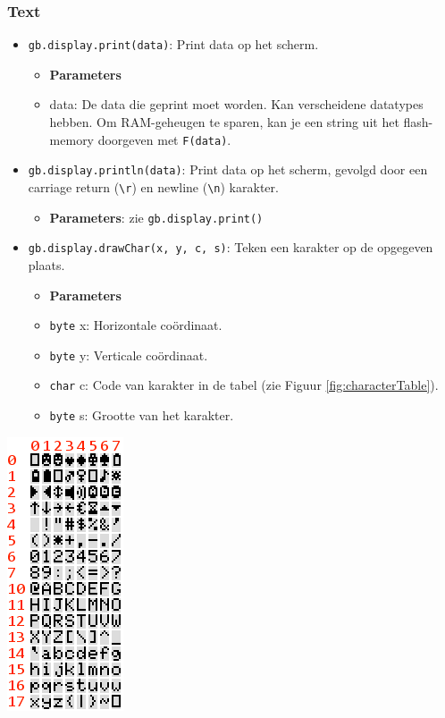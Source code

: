 \documentclass[a4paper,titlepage,12pt]{article}
\begin{document}
	\subsubsection{Text}
	\begin{minipage}{.75\textwidth}
		\begin{itemize}
			\item \texttt{gb.display.print(data)}: Print data op het scherm.
			\begin{itemize}
				\item [] \textbf{Parameters}
				\item data: De data die geprint moet worden. Kan verscheidene datatypes hebben. Om RAM-geheugen te sparen, kan je een string uit het flash-memory doorgeven met \texttt{F(data)}.
			\end{itemize}
		
			\item \texttt{gb.display.println(data)}: Print data op het scherm, gevolgd door een carriage return (\texttt{\textbackslash r}) en newline (\texttt{\textbackslash n}) karakter.
			\begin{itemize}
				\item [] \textbf{Parameters}: zie \texttt{gb.display.print()}
			\end{itemize}
		
			\item \texttt{gb.display.drawChar(x, y, c, s)}: Teken een karakter op de opgegeven plaats.
			\begin{itemize}
				\item [] \textbf{Parameters}
				\item \texttt{byte} x: Horizontale coördinaat.
				\item \texttt{byte} y: Verticale coördinaat.
				\item \texttt{char} c: Code van karakter in de tabel (zie Figuur \ref{fig:characterTable}).
				\item \texttt{byte} s: Grootte van het karakter.
			\end{itemize}
		\end{itemize}
	\end{minipage}
	\hspace{0.05\textwidth}
	\begin{minipage}{.20\textwidth}
		\centering
		\includegraphics[scale=0.6]{assets/img/font5x7}
	\end{minipage}
\end{document}

